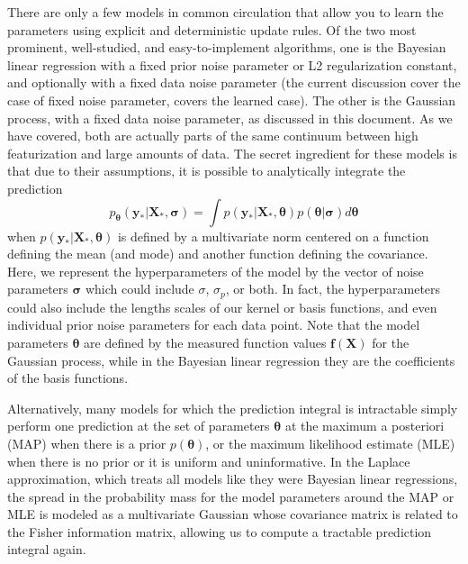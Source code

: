 \documentclass{article}
\begin{document}
There are only a few models in common circulation that allow you to learn the parameters using explicit and deterministic update rules. Of the two most prominent, well-studied, and easy-to-implement algorithms, one is the Bayesian linear regression with a fixed prior noise parameter or L2 regularization constant, and optionally with a fixed data noise parameter (the current discussion cover the case of fixed noise parameter, \cite{KoyoteScience} covers the learned case). The other is the Gaussian process, with a fixed data noise parameter, as discussed in this document. As we have covered, both are actually parts of the same continuum between high featurization and large amounts of data.  The secret ingredient for these models is that due to their assumptions, it is possible to analytically integrate the prediction 
\begin{equation}
    p_{\boldsymbol{\theta}}(\mathbf{y}_\ast|\mathbf{X}_\ast,\boldsymbol{\sigma}) = \int p(\mathbf{y}_\ast|\mathbf{X}_\ast,\boldsymbol{\theta})p(\boldsymbol{\theta}|\boldsymbol{\sigma})d\boldsymbol{\theta}
\end{equation}when $p(\mathbf{y}_\ast|\mathbf{X}_\ast,\boldsymbol{\theta})$ is defined by a multivariate norm centered on a function defining the mean (and mode) and another function defining the covariance. Here, we represent the hyperparameters of the model by the vector of noise parameters $\boldsymbol{\sigma}$ which could include $\sigma$, $\sigma_p$, or both. In fact, the hyperparameters could also include the lengths scales of our kernel or basis functions, and even individual prior noise parameters for each data point. Note that the model parameters $\boldsymbol{\theta}$ are defined by the measured function values $\mathbf{f}(\mathbf{X})$ for the Gaussian process, while in the Bayesian linear regression they are the coefficients of the basis functions.  

Alternatively, many models for which the prediction integral is intractable simply perform one prediction at the set of parameters $\boldsymbol{\theta}$ at the maximum a posteriori (MAP) when there is a prior $p(\boldsymbol{\theta})$, or the maximum likelihood estimate (MLE) when there is no prior or it is uniform and uninformative. In the Laplace approximation, which treats all models like they were Bayesian linear regressions, the spread in the probability mass for the model parameters around the MAP or MLE is modeled as a multivariate Gaussian whose covariance matrix is related to the Fisher information matrix, allowing us to compute a tractable prediction integral again.
\end{document}
